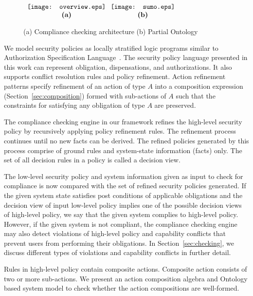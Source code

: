 \documentclass[12pt,journal,letterpaper,onecolumn]{IEEEtran}
\begin{document}
\begin{figure}[h]
\begin{center}
$\begin{array}{c@{\hspace{.1in}}c}
\texttt{[image: overview.eps]} &
\texttt{[image: sumo.eps]}\\
 \mbox{\bf (a)} & \mbox{\bf (b)}
\end{array}$
\end{center}
 \caption{(a) Compliance checking architecture (b) Partial Ontology}
 \label{fig:overview}
\end{figure}

We model security policies as locally stratified logic programs similar to
Authorization Specification Language~\cite{Jajodia01}. The
security policy language presented in this work can represent
obligation, dispensations, and authorizations. It also supports
conflict resolution rules and policy refinement. Action refinement
patterns specify refinement of an action of type $A$ into a
composition expression (Section~\ref{sec:composition}) formed with
sub-actions of $A$ such that the constraints for satisfying any
obligation of type $A$ are preserved.


The compliance checking engine in our framework refines the high-level security policy by recursively applying policy refinement rules. The refinement process continues until no new facts can be derived. The refined policies generated by this process comprise of ground rules and system-state information (facts) only. The set of all decision rules in a policy is called a decision view.

The low-level security policy and system information given as input to check for compliance is now compared with the set of refined security policies generated. If the given system state satisfies post conditions of applicable obligations and the decision view of input low-level policy implies one of the possible decision views of high-level policy, we say that the given system complies to high-level policy. However, if the given system is not compliant, the compliance checking engine may also detect violations of high-level policy and capability conflicts that prevent users from performing their obligations. In Section~\ref{sec:checking}, we discuss different types of violations and capability conflicts in further detail.

Rules in high-level policy contain composite actions. Composite
action consists of two or more sub-actions. We present an action
composition algebra and Ontology based system model to check whether
the action compositions are well-formed.
\end{document}
